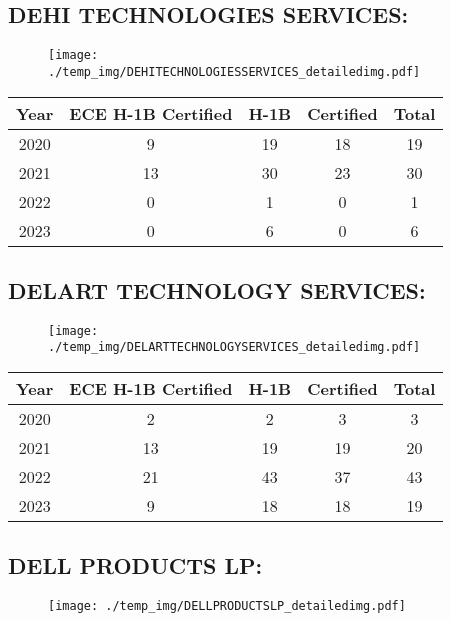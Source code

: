 \documentclass{article}%
\begin{document}
%
\newpage%
\subsection{DEHI TECHNOLOGIES SERVICES:}%
\label{subsec:DEHITECHNOLOGIESSERVICES}%
\label{DEHITECHNOLOGIESSERVICESdetailed}%


\begin{figure}[htbp]%
\centering%
\texttt{[image: ./temp\_img/DEHITECHNOLOGIESSERVICES\_detailedimg.pdf]}%
\end{figure}

%
\begin{longtable}{c|c|c|c|c}%
\hline%
Year&ECE H{-}1B Certified&H{-}1B&Certified&Total\\%
\hline%
2020&9&19&18&19\\%
\hline%
2021&13&30&23&30\\%
\hline%
2022&0&1&0&1\\%
\hline%
2023&0&6&0&6\\%
\hline%
\end{longtable}

%
\newpage%
\subsection{DELART TECHNOLOGY SERVICES:}%
\label{subsec:DELARTTECHNOLOGYSERVICES}%
\label{DELARTTECHNOLOGYSERVICESdetailed}%


\begin{figure}[htbp]%
\centering%
\texttt{[image: ./temp\_img/DELARTTECHNOLOGYSERVICES\_detailedimg.pdf]}%
\end{figure}

%
\begin{longtable}{c|c|c|c|c}%
\hline%
Year&ECE H{-}1B Certified&H{-}1B&Certified&Total\\%
\hline%
2020&2&2&3&3\\%
\hline%
2021&13&19&19&20\\%
\hline%
2022&21&43&37&43\\%
\hline%
2023&9&18&18&19\\%
\hline%
\end{longtable}

%
\newpage%
\subsection{DELL PRODUCTS LP:}%
\label{subsec:DELLPRODUCTSLP}%
\label{DELLPRODUCTSLPdetailed}%


\begin{figure}[htbp]%
\centering%
\texttt{[image: ./temp\_img/DELLPRODUCTSLP\_detailedimg.pdf]}%
\end{figure}
\end{document}
